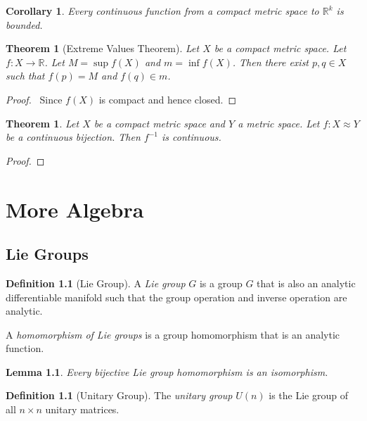 \documentclass{book}
\let\qed\relax
\newtheorem{cor}{Corollary}[prop]
\newtheorem{thm}[prop]{Theorem}
\newtheorem{lm}[prop]{Lemma}
\theoremstyle{definition}
\newtheorem{df}[prop]{Definition}
\begin{document}
\begin{cor}
Every continuous function from a compact metric space to $\mathbb{R}^k$ is bounded.
\end{cor}

\begin{thm}[Extreme Values Theorem]
Let $X$ be a compact metric space. Let $f : X \rightarrow \mathbb{R}$. Let $M = \sup f(X)$ and $m = \inf f(X)$. Then there exist $p,q \in X$ such that $f(p) = M$ and $f(q) \in m$.
\end{thm}

\begin{proof}
\pf\ Since $f(X)$ is compact and hence closed. \qed
\end{proof}

\begin{thm}
Let $X$ be a compact metric space and $Y$ a metric space. Let $f : X \approx Y$ be a continuous bijection. Then $f^{-1}$ is continuous.
\end{thm}

\begin{proof}
\pf
{}
\qed
\end{proof}

\part{More Algebra}

\chapter{Lie Groups}

\begin{df}[Lie Group]
A \emph{Lie group} $G$ is a group $G$ that is also an analytic differentiable manifold such that the group operation and inverse operation are analytic.

A \emph{homomorphism of Lie groups} is a group homomorphism that is an analytic function.
\end{df}

\begin{lm}
Every bijective Lie group homomorphism is an isomorphism.
\end{lm}


\begin{df}[Unitary Group]
The \emph{unitary group} $U(n)$ is the Lie group of all $n \times n$ unitary matrices.
\end{df}
\end{document}
